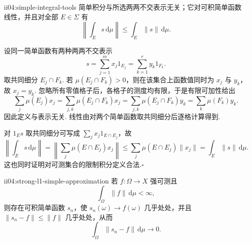 \begin{FALemma}[C][简单积分良定义及范数估计]{ii04:simple-integral-tools}
简单积分与所选两两不交表示无关；它对可积简单函数线性，并且对全部 \(\displaystyle E\in\Sigma\) 有
\[
\left\|\int_Es\,\mathrm{d}\mu\right\|
\leqslant
\int_E\|s\|\,\mathrm{d}\mu.
\]
\end{FALemma}

\begin{FAProof}
设同一简单函数有两种两两不交表示
\[
s=\sum_{j=1}^{m}x_j1_{E_j}
=
\sum_{k=1}^{r}y_k1_{F_k}.
\]
取共同细分 \(\displaystyle E_j\cap F_k\). 若 \(\displaystyle\mu(E_j\cap F_k)>0\)，则在该集合上函数值同时为 \(\displaystyle x_j\) 与 \(\displaystyle y_k\)，故 \(\displaystyle x_j=y_k\). 忽略所有零值格子后，各格子的测度均有限，于是有限可加性给出
\[
\sum_j\mu(E_j)x_j
=
\sum_{j,k}\mu(E_j\cap F_k)x_j
=
\sum_{j,k}\mu(E_j\cap F_k)y_k
=
\sum_k\mu(F_k)y_k.
\]
因此定义与表示无关. 线性由对两个简单函数取共同细分后逐格计算得到.

对 \(\displaystyle1_Es\) 取共同细分可写成 \(\displaystyle\sum_jx_j1_{E\cap E_j}\)，故
\[
\left\|\int_Es\,\mathrm{d}\mu\right\|
=
\left\|\sum_j\mu(E\cap E_j)x_j\right\|
\leqslant
\sum_j\mu(E\cap E_j)\|x_j\|
=
\int_E\|s\|\,\mathrm{d}\mu.
\]
这也同时证明对可测集合的限制积分定义合法.\hfill\(\square\)
\end{FAProof}

\begin{FALemma}[C][强可测且范数可积的简单逼近]{ii04:strong-l1-simple-approximation}
若 \(\displaystyle f:\Omega\to X\) 强可测且
\[
\int_\Omega\|f\|\,\mathrm{d}\mu<\infty,
\]
则存在可积简单函数 \(\displaystyle s_n\)，使 \(\displaystyle s_n(\omega)\to f(\omega)\) 几乎处处，并且
\(\displaystyle \|s_n-f\|\leqslant\|f\|\)
几乎处处，从而
\[
\int_\Omega\|s_n-f\|\,\mathrm{d}\mu\longrightarrow0.
\]
\end{FALemma}

